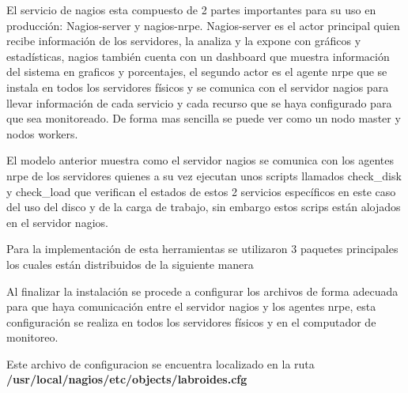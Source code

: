      
    
     
     
     El servicio de nagios esta compuesto de 2 partes importantes para su uso en producción: Nagios-server y nagios-nrpe.
   Nagios-server es el actor principal quien recibe información de los servidores, la analiza y la expone con gráficos y estadísticas, nagios también cuenta con un dashboard que muestra información del sistema en graficos y  porcentajes, el segundo actor es el agente nrpe que se instala en todos los servidores físicos y se comunica con el servidor nagios para llevar información de cada servicio y cada recurso que se haya configurado para que sea monitoreado. De forma mas sencilla se puede ver como un nodo master y nodos workers.
   
   
   
   El modelo anterior muestra como el servidor nagios se comunica con los agentes nrpe de los servidores quienes a su vez ejecutan unos scripts llamados check\_disk y check\_load que verifican el estados de estos 2 servicios específicos en este caso del uso del disco y de la carga de trabajo, sin embargo estos scrips están alojados en el servidor nagios.
   
   Para la implementación de esta herramientas se utilizaron 3 paquetes principales los cuales están distribuidos de la siguiente manera 
   
     
   
   
   Al finalizar la instalación se procede a configurar los archivos de forma adecuada para que haya comunicación entre el servidor nagios y los agentes nrpe, esta configuración se realiza en todos los servidores físicos y en el computador de monitoreo.
   
   
   Este archivo de configuracion  se encuentra localizado en la ruta \textbf{/usr/local/nagios/etc/objects/labroides.cfg}
   
   
    
   
